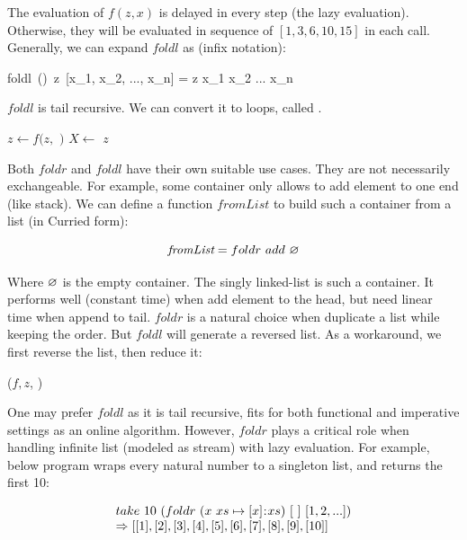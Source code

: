 \documentclass[b5paper]{article}
\begin{document}
The evaluation of $f(z, x)$ is delayed in every step (the lazy evaluation). Otherwise, they will be evaluated in sequence of $[1, 3, 6, 10, 15]$ in each call. Generally, we can expand $foldl$ as (infix notation):

\be
foldl\ (\oplus)\ z\ [x_1, x_2, ..., x_n] = z \oplus x_1 \oplus x_2 \oplus ... \oplus x_n
\ee

$foldl$ is tail recursive. We can convert it to loops, called .

\begin{algorithmic}[1]
    \State $z \gets f(z, $  $)$
    \State $X \gets$ 
  \EndWhile
  \State \Return $z$
\EndFunction
\end{algorithmic}

Both $foldr$ and $foldl$ have their own suitable use cases. They are not necessarily exchangeable. For example, some container only allows to add element to one end (like stack). We can define a function $\textit{fromList}$ to build such a container from a list (in Curried form):

\[
\textit{fromList} = foldr\ add\ \nil
\]

Where $\varnothing$ is the empty container. The singly linked-list is such a container. It performs well (constant time) when add element to the head, but need linear time when append to tail. $foldr$ is a natural choice when duplicate a list while keeping the order. But $foldl$ will generate a reversed list. As a workaround, we first reverse the list, then reduce it:

\begin{algorithmic}[1]
  \State \Return {}($f, z$, )
\EndFunction
\end{algorithmic}

One may prefer $foldl$ as it is tail recursive, fits for both functional and imperative settings as an online algorithm. However, $foldr$ plays a critical role when handling infinite list (modeled as stream) with lazy evaluation. For example, below program wraps every natural number to a singleton list, and returns the first 10:

\[
\begin{array}{l}
take\ 10\ (foldr\ (x\ xs \mapsto [x] \mathbin{\!:\!} xs)\ [\ ]\ [1, 2, ...]) \\
\Rightarrow [[1], [2], [3], [4], [5], [6], [7], [8], [9], [10]]
\end{array}
\]
\end{document}
